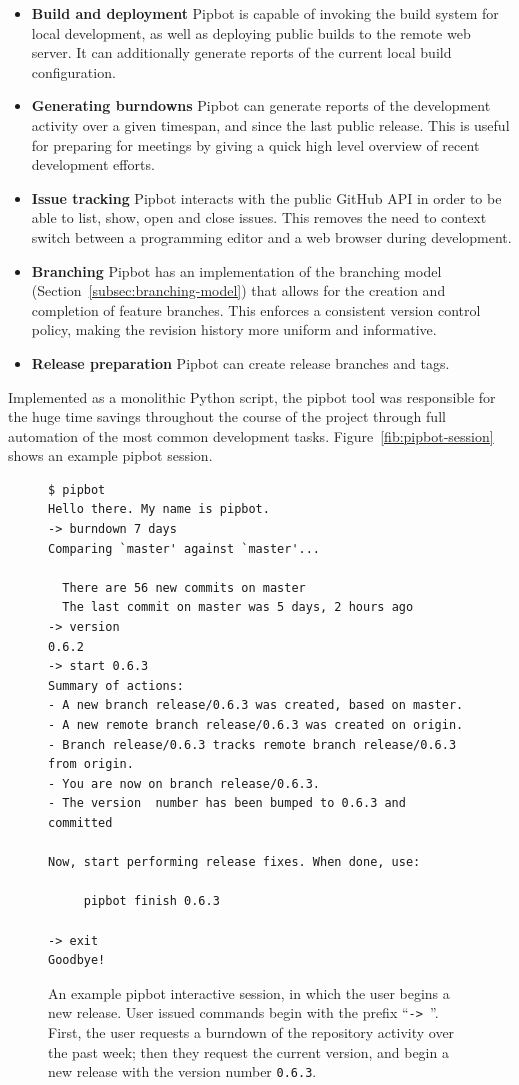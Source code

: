 \begin{itemize}
\item \textbf{Build and deployment} Pipbot is capable of invoking the
  build system for local development, as well as deploying public
  builds to the remote web server. It can additionally generate
  reports of the current local build configuration.
\item \textbf{Generating burndowns} Pipbot can generate reports of the
  development activity over a given timespan, and since the last
  public release. This is useful for preparing for meetings by giving
  a quick high level overview of recent development efforts.
\item \textbf{Issue tracking} Pipbot interacts with the public GitHub
  API in order to be able to list, show, open and close issues. This
  removes the need to context switch between a programming editor and
  a web browser during development.
\item \textbf{Branching} Pipbot has an implementation of the branching
  model (Section~\ref{subsec:branching-model}) that allows for the
  creation and completion of feature branches. This enforces a
  consistent version control policy, making the revision history more
  uniform and informative.
\item \textbf{Release preparation} Pipbot can create release branches
  and tags.
\end{itemize}

\newpage
Implemented as a monolithic Python script, the pipbot tool was
responsible for the huge time savings throughout the course of the
project through full automation of the most common development
tasks. Figure~\ref{fib:pipbot-session} shows an example pipbot
session.

\br{}


\begin{figure}[H]
\begin{verbatim}
$ pipbot
Hello there. My name is pipbot.
-> burndown 7 days
Comparing `master' against `master'...

  There are 56 new commits on master
  The last commit on master was 5 days, 2 hours ago
-> version
0.6.2
-> start 0.6.3
Summary of actions:
- A new branch release/0.6.3 was created, based on master.
- A new remote branch release/0.6.3 was created on origin.
- Branch release/0.6.3 tracks remote branch release/0.6.3 from origin.
- You are now on branch release/0.6.3.
- The version  number has been bumped to 0.6.3 and committed

Now, start performing release fixes. When done, use:

     pipbot finish 0.6.3

-> exit
Goodbye!
\end{verbatim}
\caption[Example pipbot session]
  {An example pipbot interactive session, in which the user begins a
   new release. User issued commands begin with the prefix
   ``\texttt{-> }''. First, the user requests a burndown of the
   repository activity over the past week; then they request the
   current version, and begin a new release with the version number
   \texttt{0.6.3}.}
\label{fig:pipbot-session}
\end{figure}
